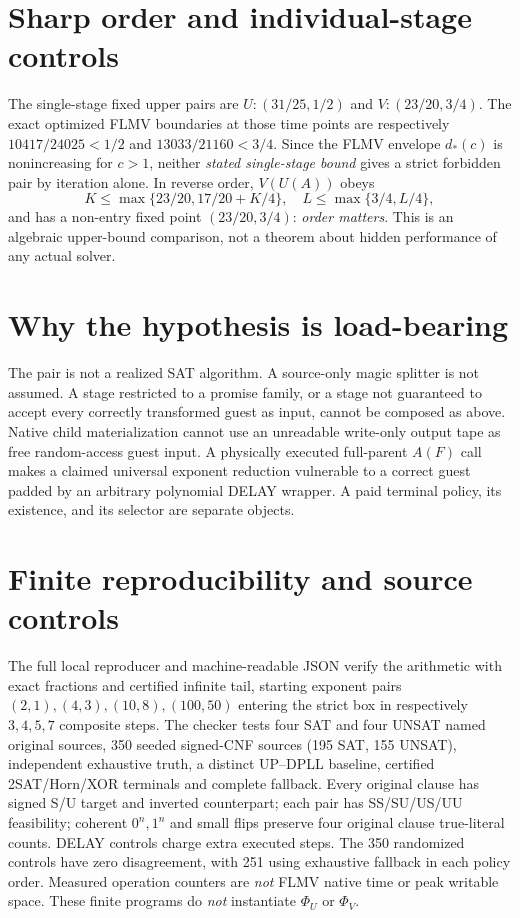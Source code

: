 \documentclass[11pt]{article}
\begin{document}
\section{Sharp order and individual-stage controls}
The single-stage fixed upper pairs are $U:(31/25,1/2)$ and $V:(23/20,3/4)$. The exact optimized FLMV boundaries at those time points are respectively $10417/24025<1/2$ and $13033/21160<3/4$. Since the FLMV envelope $d_*(c)$ is nonincreasing for $c>1$, neither \emph{stated single-stage bound} gives a strict forbidden pair by iteration alone. In reverse order, $V(U(A))$ obeys
\[
K\le\max\{23/20,17/20+K/4\},\quad
L\le\max\{3/4,L/4\},
\]
and has a non-entry fixed point $(23/20,3/4)$: \emph{order matters}. This is an algebraic upper-bound comparison, not a theorem about hidden performance of any actual solver.
\section{Why the hypothesis is load-bearing}
The pair is not a realized SAT algorithm. A source-only magic splitter is not assumed. A stage restricted to a promise family, or a stage not guaranteed to accept every correctly transformed guest as input, cannot be composed as above. Native child materialization cannot use an unreadable write-only output tape as free random-access guest input. A physically executed full-parent $A(F)$ call makes a claimed universal exponent reduction vulnerable to a correct guest padded by an arbitrary polynomial DELAY wrapper. A paid terminal policy, its existence, and its selector are separate objects.
\section{Finite reproducibility and source controls}
The full local reproducer and machine-readable JSON verify the arithmetic with exact fractions and certified infinite tail, starting exponent pairs $(2,1),(4,3),(10,8),(100,50)$ entering the strict box in respectively $3,4,5,7$ composite steps. The checker tests four SAT and four UNSAT named original sources, 350 seeded signed-CNF sources (195 SAT, 155 UNSAT), independent exhaustive truth, a distinct UP--DPLL baseline, certified 2SAT/Horn/XOR terminals and complete fallback. Every original clause has signed S/U target and inverted counterpart; each pair has SS/SU/US/UU feasibility; coherent $0^n,1^n$ and small flips preserve four original clause true-literal counts. DELAY controls charge extra executed steps. The 350 randomized controls have zero disagreement, with 251 using exhaustive fallback in each policy order. Measured operation counters are \emph{not} FLMV native time or peak writable space. These finite programs do \emph{not} instantiate $\Phi_U$ or $\Phi_V$.
\end{document}
